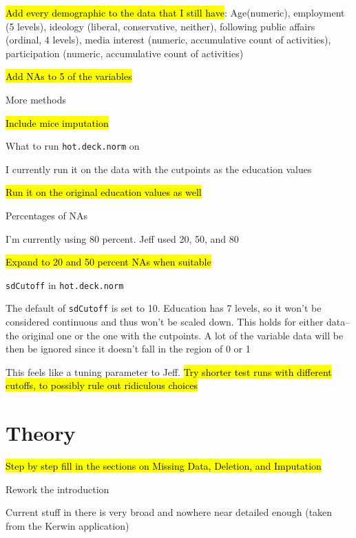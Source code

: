 \begin{coi}
			\begin{coi}
				\item \hl{Add every demographic to the data that I still have}: Age(numeric), employment (5 levels), ideology (liberal, conservative, neither), following public affairs (ordinal, 4 levels), media interest (numeric, accumulative count of activities), participation (numeric, accumulative count of activities)
				\item \hl{Add NAs to 5 of the variables}
			\end{coi}
		\item More methods
			\begin{coi}
				\item \hl{Include mice imputation}
			\end{coi}
		\item What to run \texttt{hot.deck.norm} on
			\begin{coi}
				\item I currently run it on the data with the cutpoints as the education values
				\item \hl{Run it on the original education values as well}
			\end{coi} 
		\item Percentages of NAs
			\begin{coi}
				\item I'm currently using 80 percent. Jeff used 20, 50, and 80
				\item \hl{Expand to 20 and 50 percent NAs when suitable}
			\end{coi}
		\item \texttt{sdCutoff} in \texttt{hot.deck.norm}
			\begin{coi}
				\item The default of \texttt{sdCutoff} is set to 10. Education has 7 levels, so it won't be considered continuous and thus won't be scaled down. This holds for either data-- the original one or the one with the cutpoints. A lot of the variable data will be then be ignored since it doesn't fall in the region of 0 or 1 
				\item This feels like a tuning parameter to Jeff. \hl{Try shorter test runs with different cutoffs, to possibly rule out ridiculous choices}
			\end{coi} 
	\end{coi}




\section*{Theory}
	\begin{coi}
		\item \hl{Step by step fill in the sections on Missing Data, Deletion, and Imputation}
		\item Rework the introduction
			\begin{coi}
				\item Current stuff in there is very broad and nowhere near detailed enough (taken from the Kerwin application)
			\end{coi}
	\end{coi}


			

